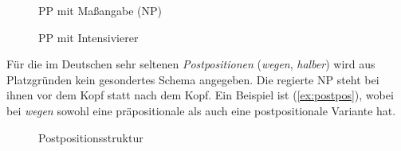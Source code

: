 \begin{exe}
  \ex\label{ex:prpgrallg}
  \begin{xlist}
  \end{xlist}
\end{exe}

\begin{figure}
  \centering
  \caption{PP mit Maßangabe (NP)}
  \label{fig:prpgrmitakkmod}
\end{figure}

\begin{figure}
  \centering
  \caption{PP mit Intensivierer}
  \label{fig:prpgrmitadvmod}
\end{figure}


Für die im Deutschen sehr seltenen \textit{Postpositionen} (\zB \textit{wegen}, \textit{halber}) wird aus Platzgründen kein gesondertes Schema angegeben.
Die regierte NP steht bei ihnen vor dem Kopf statt nach dem Kopf.
Ein Beispiel ist (\ref{ex:postpos}), wobei bei \textit{wegen} sowohl eine präpositionale als auch eine postpositionale Variante hat.

\begin{exe}
\end{exe}

\begin{figure}
  \centering
  \caption{Postpositionsstruktur}
  \label{fig:postpos}
\end{figure}

